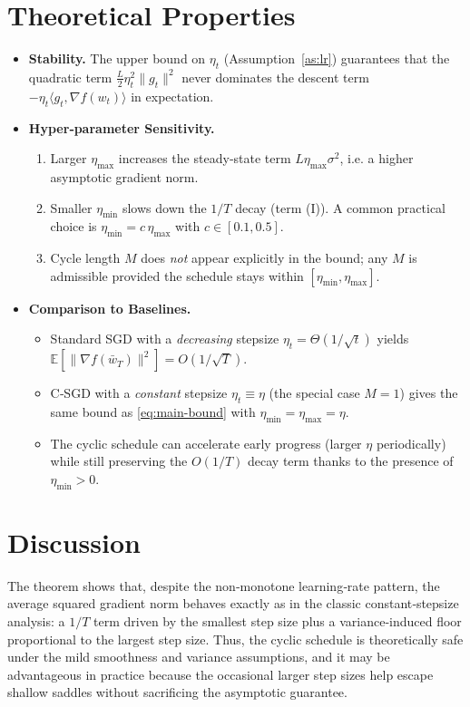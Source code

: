 \documentclass[11pt]{article}
\begin{document}
\section*{Theoretical Properties}
\begin{itemize}[noitemsep]
\item \textbf{Stability.} The upper bound on $\eta_t$ (Assumption~\ref{as:lr}) guarantees that the quadratic term
$\frac{L}{2}\eta_t^2\|g_t\|^2$ never dominates the descent term $-\eta_t\langle g_t,\nabla f(w_t)\rangle$ in expectation.
\item \textbf{Hyper‑parameter Sensitivity.}
    \begin{enumerate}[label=(\alph*)]
    \item Larger $\eta_{\max}$ increases the steady‑state term $L\eta_{\max}\sigma^2$, i.e. a higher asymptotic gradient norm.
    \item Smaller $\eta_{\min}$ slows down the $1/T$ decay (term (I)).  A common practical choice is $\eta_{\min}=c\,\eta_{\max}$ with $c\in[0.1,0.5]$.
    \item Cycle length $M$ does \emph{not} appear explicitly in the bound; any $M$ is admissible provided the schedule stays within $[\eta_{\min},\eta_{\max}]$.
    \end{enumerate}
\item \textbf{Comparison to Baselines.}
    \begin{itemize}
    \item Standard SGD with a \emph{decreasing} stepsize $\eta_t=\Theta(1/\sqrt{t})$ yields $\mathbb{E}[\|\nabla f(\bar w_T)\|^2]=O(1/\sqrt{T})$.
    \item C‑SGD with a \emph{constant} stepsize $\eta_t\equiv\eta$ (the special case $M=1$) gives the same bound as \eqref{eq:main-bound} with $\eta_{\min}=\eta_{\max}=\eta$.
    \item The cyclic schedule can accelerate early progress (larger $\eta$ periodically) while still preserving the $O(1/T)$ decay term thanks to the presence of $\eta_{\min}>0$.
    \end{itemize}
\end{itemize}

\section*{Discussion}
The theorem shows that, despite the non‑monotone learning‑rate pattern, the average squared gradient norm behaves exactly as in the classic constant‑stepsize analysis: a $1/T$ term driven by the smallest step size plus a variance‑induced floor proportional to the largest step size.  Thus, the cyclic schedule is theoretically safe under the mild smoothness and variance assumptions, and it may be advantageous in practice because the occasional larger step sizes help escape shallow saddles without sacrificing the asymptotic guarantee.
\end{document}
